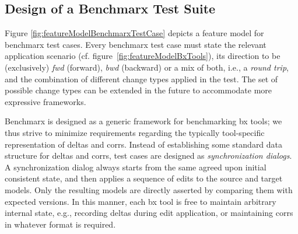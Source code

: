 \subsection{Design of a Benchmarx Test Suite}

Figure \ref{fig:featureModelBenchmarxTestCase} depicts a feature model for benchmarx test cases. 
Every benchmarx test case must state the relevant application scenario (cf. figure~\ref{fig:featureModelBxTools}), its direction to be (exclusively) \emph{fwd} (forward), \emph{bwd} (backward) or a mix of both, i.e., a \emph{round trip}, and the combination of different change types applied in the test. 
The set of possible change types can be extended in the future to accommodate more expressive frameworks. 

Benchmarx is designed as a generic framework for benchmarking bx tools; we thus strive to minimize requirements regarding the typically tool-specific representation of deltas and corrs. 
Instead of establishing some standard data structure for deltas and corrs, test cases are designed as \emph{synchronization dialogs}. 
A synchronization dialog always starts from the same agreed upon initial consistent state, and then applies a sequence of edits to the source and target models. 
Only the resulting models are directly asserted by comparing them with expected versions.
In this manner, each bx tool is free to maintain arbitrary internal state, e.g., recording deltas during edit application, or maintaining corrs in whatever format is required.

